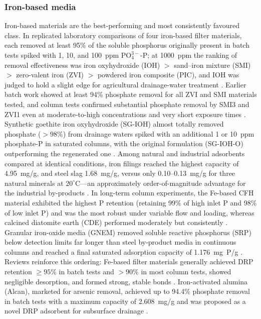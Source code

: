 \documentclass[11pt]{article}
\begin{document}
\subsubsection{Iron-based media}

Iron-based materials are the best-performing and most consistently favoured
class. In replicated laboratory comparisons of four iron-based filter materials,
each removed at least 95\% of the soluble phosphorus originally present in
batch tests spiked with 1, 10, and 100~ppm $\mathrm{PO_4^{3-}}$-P; at 1000~ppm the
ranking of removal effectiveness was iron oxyhydroxide (IOH) $>$ sand--iron
mixture (SMI) $>$ zero-valent iron (ZVI) $>$ powdered iron composite (PIC), and
IOH was judged to hold a slight edge for agricultural drainage-water treatment
\parencite{Allred2014}. Earlier batch work showed at least 94\% phosphate removal
for all ZVI and SMI materials tested, and column tests confirmed substantial
phosphate removal by SMI3 and ZVI1 even at moderate-to-high concentrations and
very short exposure times \parencite{Allred2012}. Synthetic goethite iron
oxyhydroxide (SG-IOH) almost totally removed phosphate ($>98\%$) from drainage
waters spiked with an additional 1 or 10~ppm phosphate-P in saturated columns,
with the original formulation (SG-IOH-O) outperforming the regenerated one
\parencite{Allred2017}. Among natural and industrial adsorbents compared at
identical conditions, iron filings reached the highest capacity of 4.95~mg/g,
and steel slag 1.68~mg/g, versus only 0.10--0.13~mg/g for three natural minerals
at $20^{\circ}$C---an approximately order-of-magnitude advantage for the
industrial by-products \parencite{Sellner2019b}. In long-term column experiments,
the Fe-based CFH material exhibited the highest P retention (retaining 99\% of
high inlet P and 98\% of low inlet P) and was the most robust under variable flow
and loading, whereas calcined diatomite earth (CDE) performed moderately but
consistently \parencite{Pugliese2023}. Granular iron-oxide media (GNEM) removed
soluble reactive phosphorus (SRP) below detection limits far longer than steel
by-product media in continuous columns and reached a final saturated adsorption
capacity of 1.176~mg~P/g \parencite{Hauda2020}. Reviews reinforce this ordering:
Fe-based filter materials generally achieved DRP retention $\geq 95\%$ in batch
tests and $>90\%$ in most column tests, showed negligible desorption, and formed
strong, stable bonds \parencite{Mendes2022}. Iron-activated alumina (Alcan),
marketed for arsenic removal, achieved up to 94.4\% phosphate removal in batch
tests with a maximum capacity of 2.608~mg/g and was proposed as a novel DRP
adsorbent for subsurface drainage \parencite{Kumari2025}.
\end{document}
